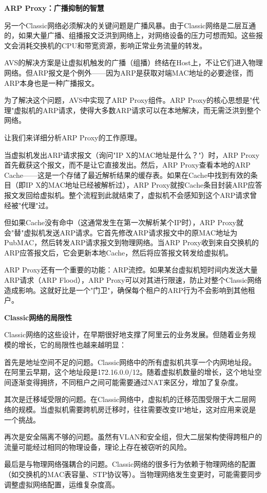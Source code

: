 \textbf{ARP Proxy：广播抑制的智慧}

另一个Classic网络必须解决的关键问题是广播风暴。由于Classic网络是二层互通的，如果大量广播、组播报文泛洪到网络上，对网络设备的压力可想而知。这些报文会消耗交换机的CPU和带宽资源，影响正常业务流量的转发。

AVS的解决方案是让虚拟机触发的广播（组播）终结在Host上，不让它们进入物理网络。但ARP报文是个例外——因为ARP是获取对端MAC地址的必要途径，而ARP本身也是一种广播报文。

为了解决这个问题，AVS中实现了ARP Proxy组件。ARP Proxy的核心思想是"代理"虚拟机的ARP请求，使得大多数ARP请求可以在本地解决，而无需泛洪到整个网络。

让我们来详细分析ARP Proxy的工作原理。

当虚拟机发出ARP请求报文（询问"IP X的MAC地址是什么？"）时，ARP Proxy首先截获这个报文，而不是让它直接发出。然后，ARP Proxy查看本地的ARP Cache——这是一个存储了最近解析结果的缓存表。如果在Cache中找到有效的条目（即IP X的MAC地址已经被解析过），ARP Proxy就按Cache条目封装ARP应答报文发回给虚拟机。整个流程到此就结束了，虚拟机不会感知到这个ARP请求曾经被"代理"过。

但如果Cache没有命中（这通常发生在第一次解析某个IP时），ARP Proxy就会"替"虚拟机发送ARP请求。它首先修改ARP请求报文中的原MAC地址为PubMAC，然后转发ARP请求报文到物理网络。当ARP Proxy收到来自交换机的ARP应答报文后，它会更新本地Cache，然后将应答报文转发给虚拟机。

ARP Proxy还有一个重要的功能：ARP流控。如果某台虚拟机短时间内发送大量ARP请求（ARP Flood），ARP Proxy可以对其进行限速，防止对整个Classic网络造成影响。这就好比是一个"门卫"，确保每个租户的ARP行为不会影响到其他租户。

\textbf{Classic网络的局限性}

Classic网络的这些设计，在早期很好地支撑了阿里云的业务发展。但随着业务规模的增长，它的局限性也越来越明显：

首先是地址空间不足的问题。Classic网络中的所有虚拟机共享一个内网地址段。在阿里云早期，这个地址段是172.16.0.0/12。随着虚拟机数量的增长，这个地址空间逐渐变得拥挤，不同租户之间可能需要通过NAT来区分，增加了复杂度。

其次是迁移域受限的问题。在Classic网络中，虚拟机的迁移范围受限于大二层网络的规模。当虚拟机需要跨机房迁移时，往往需要改变IP地址，这对应用来说是一个挑战。

再次是安全隔离不够的问题。虽然有VLAN和安全组，但大二层架构使得跨租户的流量可能经过相同的物理设备，理论上存在被窃听的风险。

最后是与物理网络强耦合的问题。Classic网络的很多行为依赖于物理网络的配置（如交换机的MAC表容量、STP协议等）。当物理网络发生变更时，可能需要同步调整虚拟网络配置，运维复杂度高。

